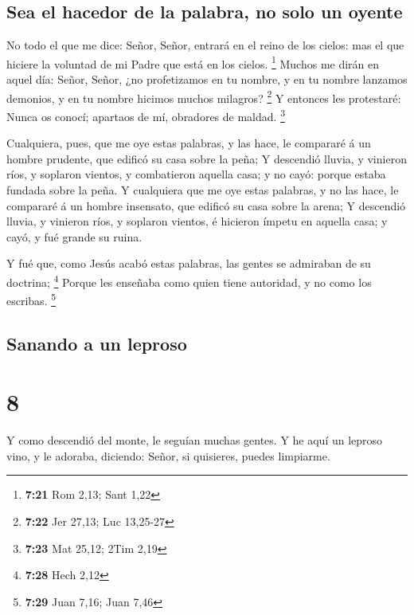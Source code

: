 \hypertarget{sea-el-hacedor-de-la-palabra-no-solo-un-oyente}{%
\subsection{Sea el hacedor de la palabra, no solo un
oyente}\label{sea-el-hacedor-de-la-palabra-no-solo-un-oyente}}

 No todo el que me dice: Señor, Señor, entrará en el
reino de los cielos: mas el que hiciere la voluntad de mi Padre que está
en los cielos. \footnote{\textbf{7:21} Rom 2,13; Sant 1,22}
 Muchos me dirán en aquel día: Señor, Señor, ¿no
profetizamos en tu nombre, y en tu nombre lanzamos demonios, y en tu
nombre hicimos muchos milagros? \footnote{\textbf{7:22} Jer 27,13; Luc
  13,25-27}  Y entonces les protestaré: Nunca os conocí;
apartaos de mí, obradores de maldad. \footnote{\textbf{7:23} Mat 25,12;
  2Tim 2,19}

 Cualquiera, pues, que me oye estas palabras, y las hace,
le compararé á un hombre prudente, que edificó su casa sobre la peña;
 Y descendió lluvia, y vinieron ríos, y soplaron vientos,
y combatieron aquella casa; y no cayó: porque estaba fundada sobre la
peña.  Y cualquiera que me oye estas palabras, y no las
hace, le compararé á un hombre insensato, que edificó su casa sobre la
arena;  Y descendió lluvia, y vinieron ríos, y soplaron
vientos, é hicieron ímpetu en aquella casa; y cayó, y fué grande su
ruina.

 Y fué que, como Jesús acabó estas palabras, las gentes
se admiraban de su doctrina; \footnote{\textbf{7:28} Hech 2,12}
 Porque les enseñaba como quien tiene autoridad, y no
como los escribas. \footnote{\textbf{7:29} Juan 7,16; Juan 7,46}

\hypertarget{sanando-a-un-leproso}{%
\subsection{Sanando a un leproso}\label{sanando-a-un-leproso}}

\hypertarget{section-7}{%
\section{8}\label{section-7}}

 Y como descendió del monte, le seguían muchas gentes.
 Y he aquí un leproso vino, y le adoraba, diciendo: Señor,
si quisieres, puedes limpiarme.

